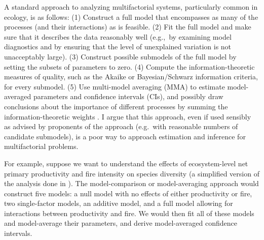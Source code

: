\documentclass[entropy,article,accept,pdftex,moreauthors]{Definitions/mdpi}
\begin{document}
A standard approach to analyzing multifactorial systems, particularly
common in ecology, is as follows: (1) Construct a full model that
encompasses as many of the processes (and their interactions) as is
feasible. (2) Fit the full model and make sure that it describes the
data reasonably well (e.g.,~by examining model diagnostics and by ensuring that the level of unexplained variation is not unacceptably large).
(3) Construct possible submodels of the full model by setting the subsets of
parameters to zero. (4) Compute the information-theoretic measures of
quality, such as the Akaike or Bayesian/Schwarz information criteria,
for every submodel. (5) Use multi-model averaging (MMA) to estimate
model-averaged parameters and confidence intervals (CIs), and possibly draw
conclusions about the importance of different processes by summing the
information-theoretic weights \cite{ref-burnham_model_2002}. I argue that
this approach, even if used sensibly as advised by proponents of the
approach (e.g.~with reasonable numbers of candidate submodels), is a
poor way to approach estimation and inference for multifactorial
problems.

For example, suppose we want to understand the effects of
ecosystem-level net primary productivity and fire intensity on species
diversity (a simplified version of the analysis done in \cite{ref-moritzRole2023a}). The model-comparison or model-averaging
approach would construct five models: a null model with no effects of
either productivity or fire, two single-factor models, an additive
model, and a full model allowing for interactions between productivity
and fire. We would then fit all of these models and model-average their
parameters, and derive model-averaged confidence intervals.
\end{document}
